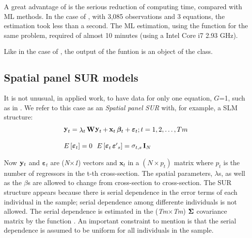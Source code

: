 \documentclass[article]{jss}
\begin{document}
A great advantage of  is the serious reduction of computing time, compared with ML methods. In the case of , with 3,085 observations and 3 equations, the estimation took less than a second. The ML estimation, using the function  for the same problem, required of almost 10 minutes (using a Intel Core i7 2.93 GHz).

Like in the case of , the output of the funtion  is an object of the  class.

\hypertarget{panel}{%
\subsection{Spatial panel SUR models}\label{panel}}

It is not unusual, in applied work, to have data for only one equation, \(G\)=1, such as in \citet{Anselin1988a}. We refer to this case as an \emph{Spatial panel SUR} with, for example, a SLM structure:
\begin{equation}
  {\begin{array}{ll}  {\mathop{{\bf y}}}_{t} = \mathop{\lambda}_{t} {\bf W} \mathop{{\bf y}}_{t} +\mathop{{\bf x}}_{t} {\boldsymbol \beta}_{t} +\mathop{{\boldsymbol \varepsilon}}_{t}; {t=1,2,\ldots ,Tm}
 \\ {} \\
  {E\left[\mathop{{\boldsymbol \varepsilon}}_{t} \right]=0} \ \ {E\left[\mathop{{\boldsymbol \varepsilon}}_{\mathop{t}} \mathop{{\boldsymbol \varepsilon'}}_{\mathop{s}} \right]=\mathop{\sigma}_{t,s} {\bf I}_{N}}
  \end{array}}
  \label{eq:Anselin1}
 \end{equation}

Now \({\bf y}_t\) and \({\boldsymbol \varepsilon}_t\) are (\emph{N}\(\times\)\emph{1}) vectors and \(\textbf{x}_{t}\) in a \((N \times p_{t})\) matrix where \(p_{t}\) is the number of regressors in the t-th cross-section. The spatial parameters, \(\lambda\)s, as well as the \(\beta\)s are allowed to change from cross-section to cross-section. The SUR structure appears because there is serial dependence in the error terms of each individual in the sample; serial dependence among differente individuals is not allowed. The serial dependence is estimated in the (\emph{Tm}\(\times\)\emph{Tm}) \({\bf \Sigma}\) covariance matrix by the function . An important constraint to mention is that the serial dependence is assumed to be uniform for all individuals in the sample.
\end{document}

